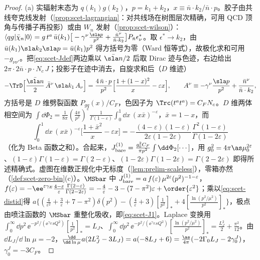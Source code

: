 \begin{proof}
(a) 实辐射末态为 $q(k_1)g(k_2)$，$p=k_1+k_2$，$x\equiv\bar n\cdot k_2/\bar n\cdot p$。胶子由共线夸克线发射（\cref{prop:scet-lagrangian}：对共线场在树图层次精确，可用 QCD 顶角与传播子再投影）或由 $W_n$ 发射（\cref{prop:scet-wilson}）：
$\langle qg|\bar\chi_n|0\rangle=g\,t^a\,\bar u(k_1)\big[-\gamma^\nu\frac{\sla p}{p^2}+\frac{\bar n^\nu}{\bar n\cdot k_2}\big]P_{\bar n}\epsilon^*_\nu$。取 $\epsilon^*\to k_2$，由 $\bar u(k_1)\sla k_2\sla p=\bar u(k_1)p^2$ 得方括号为零（Ward 恒等式），故极化求和可用 $-g_{\nu\nu'}$。把\cref{eq:scet-Jdef}两边乘以 $\bar{\sla n}/2$ 后取 Dirac 迹与色迹，右边给出 $2\pi\cdot2\bar n\cdot p\cdot N_c\,J$；投影子在迹中消去，自旋求和后（$D$ 维迹）
\[
-\TrD\Big[\frac{\bar{\sla n}}{2}\,\bar A^\nu\,\sla k_1\,A_\nu\Big]=\frac{4\,\bar n\cdot p}{p^2}\Big[\frac{1+(1-x)^2}{x}-\varepsilon x\Big],\qquad A^\nu\equiv-\gamma^\nu\frac{\sla p}{p^2}+\frac{\bar n^\nu}{\bar n\cdot k_2},
\]
方括号是 $D$ 维劈裂函数 $P_{gq}(x)/C_F$，色因子为 $\Trc(t^at^a)=C_FN_c$。$D$ 维两体相空间为 $\int\dd\Phi_2=\frac{1}{8\pi}(\frac{4\pi}{p^2})^\varepsilon\frac{1}{\Gamma(1-\varepsilon)}\int_0^1\dd x\,(x\bar x)^{-\varepsilon}$，$\bar x=1-x$，而
\[
\int_0^1\dd x\,(x\bar x)^{-\varepsilon}\Big[\frac{1+\bar x^2}{x}-\varepsilon x\Big]=-\frac{(4-\varepsilon)(1-\varepsilon)}{2\varepsilon(1-2\varepsilon)}\frac{\Gamma^2(1-\varepsilon)}{\Gamma(1-2\varepsilon)}
\]
（化为 Beta 函数之和）。合起来，$J^{(1)}_{\rm bare}=\frac{g_0^2C_F}{\pi p^2}\int\dd\Phi_2[\cdots]$，用 $g_0^2=4\pi\as\mu_0^{2\varepsilon}$、$(1-\varepsilon)\Gamma(1-\varepsilon)=\Gamma(2-\varepsilon)$、$(1-2\varepsilon)\Gamma(1-2\varepsilon)=\Gamma(2-2\varepsilon)$ 即得所述精确式。虚图在维数正规化中无标度（\cref{lem:prelim-scaleless}），零箱亦然（\cref{def:scet-zero-bin}(c)）。$\MSbar$ 中 $J^{(1)}_{\rm bare}=a\,f(\varepsilon)\,\mu^{2\varepsilon}(p^2)^{-1-\varepsilon}$，$f(\varepsilon)=-\ee^{\varepsilon\gamma_E}\frac{4-\varepsilon}{\varepsilon}\frac{\Gamma(2-\varepsilon)}{\Gamma(2-2\varepsilon)}=-\frac4\varepsilon-3-(7-\pi^2)\varepsilon+\order{\varepsilon^2}$；乘以\cref{eq:scet-distid}得
$a\{(\frac4{\varepsilon^2}+\frac3\varepsilon+7-\pi^2)\delta(p^2)-(\frac4\varepsilon+3)[\frac1{p^2}]_*+4[\frac{\ln(p^2/\mu^2)}{p^2}]_*\}$，极点由喷注函数的 $\MSbar$ 重整化吸收，即\cref{eq:scet-J1}。Laplace 变换用 $\int_0^\infty\dd p^2\,\ee^{-p^2/(\ee^{\gamma_E}sQ^2)}[\frac1{p^2}]_*=L_J$、$\int_0^\infty\dd p^2\,\ee^{-p^2/(\ee^{\gamma_E}sQ^2)}[\frac{\ln(p^2/\mu^2)}{p^2}]_*=\frac{L_J^2}{2}+\frac{\pi^2}{12}$。由 $\dd L_J/\dd\ln\mu=-2$，$\frac{\dd}{\dd\ln\mu}a(2L_J^2-3L_J)=a(-8L_J+6)=\frac{\as}{4\pi}(-2\Gamma_0L_J-2\gamma^J_0)$，$\gamma^J_0=-3C_F$。%

\end{proof}
